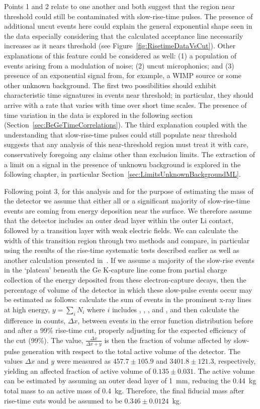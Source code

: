 	Points 1 and 2 relate to one another and both suggest that the region near threshold could still be contaminated with slow-rise-time pulses.  The presence of additional uncut events here could explain the general exponential shape seen in the data especially considering that the calculated acceptance line necessarily increases as it nears threshold (see Figure~\ref{fig:RisetimeDataVsCut}).  Other explanations of this feature could be considered as well: (1) a population of events arising from a modulation of noise; (2) uncut microphonics; and (3) presence of an exponential signal from, for example, a WIMP source or some other unknown background.  The first two possibilities should exhibit characteristic time signatures in events near threshold; in particular, they should arrive with a rate that varies with time over short time scales.  The presence of time variation in the data is explored in the following section (Section~\ref{sec:BeGeTimeCorrelations}).  The third explanation coupled with the understanding that slow-rise-time pulses could still populate near threshold suggests that any analysis of this near-threshold region must treat it with care, conservatively foregoing any claims other than exclusion limits.  The extraction of a limit on a signal in the presence of unknown background is explored in the following chapter, in particular Section~\ref{sec:LimitsUnknownBackgroundML}.  
	
	Following point 3, for this analysis and for the purpose of estimating the mass of the detector we assume that either all or a significant majority of slow-rise-time events are coming from energy deposition near the surface.  We therefore assume that the detector includes an outer dead layer within the outer Li contact, followed by a transition layer with weak electric fields.  We can calculate the width of this transition region through two methods and compare, in particular using the results of the rise-time systematic tests described earlier as well as another calculation presented in~\cite{Aalseth:2010aa}.  If we assume a majority of the slow-rise events in the `plateau' beneath the Ge K-capture line come from partial charge collection of the energy deposited from these electron-capture decays, then the percentage of volume of the detector in which these slow-pulse events occur may be estimated as follows:  calculate the sum of events in the prominent x-ray lines at high energy, $ y = \sum_{i} N_{i}$ where $i$ includes \gersixeight, \galsixeight, \znsixfive, and \asseventhree, and then calculate the difference in counts, $\Delta x$, between events in the error function distribution before and after a 99\% rise-time cut, properly adjusting for the expected efficiency of the cut (99\%).  The value, $\frac{\Delta x}{\Delta x + y}$ is then the fraction of volume affected by slow-pulse generation with respect to the total active volume of the detector.  The values $\Delta x$ and $y$ were measured as $457.7\pm105.9$ and $3401.8\pm121.3$, respectively, yielding an affected fraction of active volume of $0.135\pm0.031$.  The active volume can be estimated by assuming an outer dead layer of 1~mm, reducing the 0.44~kg total mass to an active mass of 0.4~kg.  Therefore, the final fiducial mass after rise-time cuts would be assumed to be $0.346\pm0.0124$~kg.

